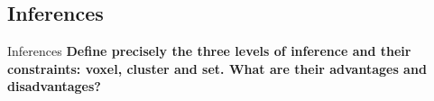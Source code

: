 \documentclass{beamer}
\begin{document}
%
%
%


\subsection[Inferences]{Inferences}

\begin{frame}{Inferences}
  \textbf{Define precisely the three levels of inference and their constraints: voxel, cluster and set. What are their advantages and disadvantages?}

%
\end{frame}
\end{document}
